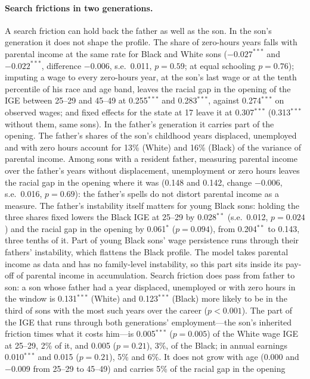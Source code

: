 \paragraph{Search frictions in two generations.} A search friction can hold back the father as well as the son. In the
son's generation it does not shape the profile. The share of zero-hours years falls with parental income at the same
rate for Black and White sons ($-0.027^{***}$ and $-0.022^{***}$, difference $-0.006$, s.e.\ 0.011, $p = 0.59$; at
equal schooling $p = 0.76$); imputing a wage to every zero-hours year, at the son's last wage or at the tenth
percentile of his race and age band, leaves the racial gap in the opening of the IGE between 25--29 and 45--49 at
0.255$^{***}$ and 0.283$^{***}$, against 0.274$^{***}$ on observed wages; and fixed effects for the state at 17 leave
it at 0.307$^{***}$ (0.313$^{***}$ without them, same sons). In the father's generation it carries part of the
opening. The father's shares of the son's childhood years displaced, unemployed and with zero hours account for 13\%
(White) and 16\% (Black) of the variance of parental income. Among sons with a resident father, measuring parental
income over the father's years without displacement, unemployment or zero hours leaves the racial gap in the opening
where it was (0.148 and 0.142, change $-0.006$, s.e.\ 0.016, $p = 0.69$): the father's spells do not distort parental
income as a measure. The father's instability itself matters for young Black sons: holding the three shares fixed
lowers the Black IGE at 25--29 by 0.028$^{**}$ (s.e.\ 0.012, $p = 0.024$) and the racial gap in the opening by
0.061$^{*}$ ($p = 0.094$), from 0.204$^{**}$ to 0.143, three tenths of it. Part of young Black sons' wage persistence
runs through their fathers' instability, which flattens the Black profile. The model takes parental income as data and
has no family-level instability, so this part sits inside its pay-off of parental income in accumulation. Search
friction does pass from father to son: a son whose father had a year displaced, unemployed or with zero hours in the
window is 0.131$^{***}$ (White) and 0.123$^{***}$ (Black) more likely to be in the third of sons with the most such
years over the career ($p < 0.001$). The part of the IGE that runs through both generations' employment---the son's
inherited friction times what it costs him---is 0.005$^{***}$ ($p = 0.005$) of the White wage IGE at 25--29, 2\% of it,
and 0.005 ($p = 0.21$), 3\%, of the Black; in annual earnings 0.010$^{***}$ and 0.015 ($p = 0.21$), 5\% and 6\%. It
does not grow with age (0.000 and $-0.009$ from 25--29 to 45--49) and carries 5\% of the racial gap in the opening
